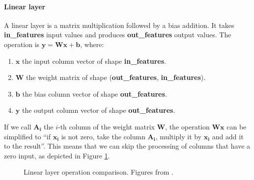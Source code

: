 \paragraph[short]{Linear layer} A linear layer is a matrix multiplication followed by a bias addition. It takes \textbf{in\_features} input values and produces \textbf{out\_features} output values. The operation is $\bm{y} = \bm{W} \bm{x} + \bm{b}$, where:

\begin{enumerate}
\item $\bm{x}$ the input column vector of shape \textbf{in\_features}.
\item $\bm{W}$ the weight matrix of shape (\textbf{out\_features}, \textbf{in\_features}).
\item $\bm{b}$ the bias column vector of shape \textbf{out\_features}.
\item $\bm{y}$ the output column vector of shape \textbf{out\_features}.
\end{enumerate}

If we call $\bm{A_i}$ the $i$-th column of the weight matrix $\bm{W}$, the operation $\bm{W} \bm{x}$ can be simplified to \enquote{if $\bm{x_i}$ is not zero, take the column $\bm{A_i}$, multiply it by $\bm{x_i}$ and add it to the result}. This means that we can skip the processing of columns that have a zero input, as depicted in Figure \ref{fig:linear_comparison}.

\begin{figure}[H]
\centering
{}%
\qquad
{}%
\caption{Linear layer operation comparison. Figures from \cite{nnue-pytorch}.}
\label{fig:linear_comparison}
\end{figure}

